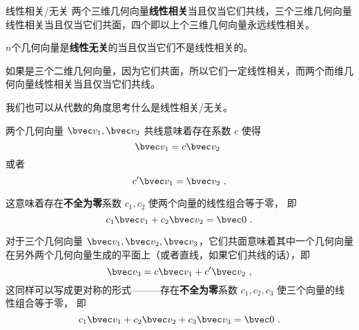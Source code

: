 
\begin{issues}
\issueTODO
\end{issues}


% 

\begin{definition}{线性相关/无关}\label{def_linDpe_1}
两个三维几何向量\textbf{线性相关}当且仅当它们共线，三个三维几何向量线性相关当且仅当它们共面，四个即以上个三维几何向量永远线性相关。

$n$个几何向量是\textbf{线性无关}的当且仅当它们不是线性相关的。
\end{definition}

如果是三个二维几何向量，因为它们共面，所以它们一定线性相关，而两个而维几何向量线性相关当且仅当它们共线。

我们也可以从代数的角度思考什么是线性相关/无关。

两个几何向量 $\bvec v_1, \bvec v_2$ 共线意味着存在系数 $c$ 使得
$$
\bvec v_1 = c \bvec v_2~
$$
或者
$$
c' \bvec v_1 = \bvec v_2~,
$$

这意味着存在\textbf{不全为零}系数 $c_1, c_2$ 使两个向量的线性组合等于零， 即
\begin{equation}\label{eq_linDpe_2}
c_1 \bvec v_1 + c_2 \bvec v_2 = \bvec 0~.
\end{equation}

对于三个几何向量 $\bvec v_1, \bvec v_2, \bvec v_3$，它们共面意味着其中一个几何向量在另外两个几何向量生成的平面上（或者直线，如果它们共线的话），即
\begin{equation}
\bvec v_3 = c \bvec v_1 + c' \bvec v_2~,
\end{equation}
这同样可以写成更对称的形式———存在\textbf{不全为零}系数 $c_1, c_2, c_3$ 使三个向量的线性组合等于零， 即
\begin{equation}
c_1 \bvec v_1 + c_2 \bvec v_2 + c_3 \bvec v_3 = \bvec 0~.
\end{equation}



